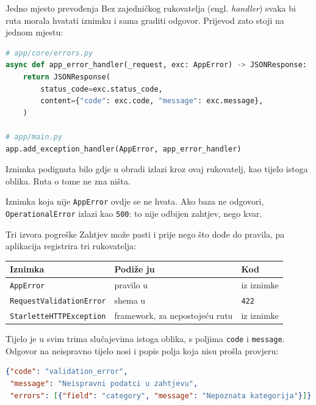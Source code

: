 \begin{frame}[fragile]{Jedno mjesto prevođenja}
Bez zajedničkog rukovatelja (engl. \emph{handler}) svaka bi ruta morala hvatati iznimku i sama graditi odgovor. Prijevod zato stoji na jednom mjestu:

\begin{lstlisting}[language=python]
# app/core/errors.py
async def app_error_handler(_request, exc: AppError) -> JSONResponse:
    return JSONResponse(
        status_code=exc.status_code,
        content={"code": exc.code, "message": exc.message},
    )

# app/main.py
app.add_exception_handler(AppError, app_error_handler)
\end{lstlisting}

\vspace{0.3em}
Iznimka podignuta bilo gdje u obradi izlazi kroz ovaj rukovatelj, kao tijelo istoga oblika. Ruta o tome ne zna ništa.

\vspace{0.3em}
Iznimka koja nije \texttt{AppError} ovdje se ne hvata. Ako baza ne odgovori, \texttt{OperationalError} izlazi kao \texttt{500}: to nije odbijen zahtjev, nego kvar.
\end{frame}

\begin{frame}[fragile]{Tri izvora pogreške}
Zahtjev može pasti i prije nego što dođe do pravila, pa aplikacija registrira tri rukovatelja:

\vspace{0.5em}
\begin{center}
{\small
\setlength{\tabcolsep}{3pt}
\renewcommand{\arraystretch}{1.45}
\begin{tabular}{@{}L{4.4cm}L{5.1cm}L{1.6cm}@{}}
  \toprule
  \textbf{Iznimka} & \textbf{Podiže ju} & \textbf{Kod} \\
  \midrule
  \texttt{AppError} & pravilo u  & iz iznimke \\
  \texttt{RequestValidationError} & shema u  & \texttt{422} \\
  \texttt{StarletteHTTPException} & framework, za nepostojeću rutu & iz iznimke \\
  \bottomrule
\end{tabular}
}
\end{center}

\vspace{0.35em}
Tijelo je u svim trima slučajevima istoga oblika, s poljima \texttt{code} i \texttt{message}. Odgovor na neispravno tijelo nosi i popis polja koja nisu prošla provjeru:

\begin{lstlisting}[language=json]
{"code": "validation_error",
 "message": "Neispravni podatci u zahtjevu",
 "errors": [{"field": "category", "message": "Nepoznata kategorija"}]}
\end{lstlisting}
\end{frame}

